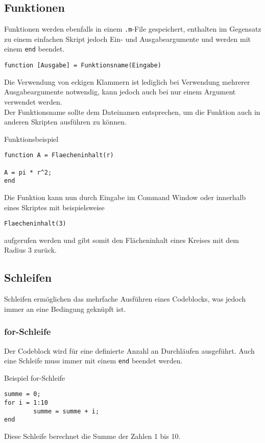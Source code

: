         \subsection{Funktionen}
        Funktionen werden ebenfalls in einem \texttt{.m}-File gespeichert, enthalten im Gegensatz zu einem einfachen Skript jedoch Ein- und Ausgabeargumente und werden mit einem \texttt{end} beendet.
        \begin{center}
                \texttt{function [Ausgabe] = Funktionsname(Eingabe)}     
        \end{center}
                Die Verwendung von eckigen Klammern ist lediglich bei Verwendung mehrerer Ausgabeargumente notwendig, kann jedoch auch bei nur einem Argument verwendet werden. \\
                Der Funktionsname sollte dem Dateinamen entsprechen, um die Funktion auch in anderen Skripten ausführen zu können.
                \begin{Codelösung}{Funktionsbeispiel}
                        \begin{lstlisting}
function A = Flaecheninhalt(r)

A = pi * r^2;
end       
                        \end{lstlisting}

                \end{Codelösung}
                \noindent
                Die Funktion kann nun durch Eingabe im Command Window oder innerhalb eines Skriptes mit beispielsweise
                \begin{center}
                        \texttt{Flaecheninhalt(3)}
                \end{center}
                aufgerufen werden und gibt somit den Flächeninhalt eines Kreises mit dem Radius 3 zurück.
        \subsection{Schleifen}
                Schleifen ermöglichen das mehrfache Ausführen eines Codeblocks, was jedoch immer an eine Bedingung geknüpft ist.
                \subsubsection*{for-Schleife}
                Der Codeblock wird für eine definierte Anzahl an Durchläufen ausgeführt. Auch eine Schleife muss immer mit einem \texttt{end} beendet werden.
                \begin{Codelösung}{Beispiel for-Schleife}
                        \begin{lstlisting}
summe = 0;
for i = 1:10
        summe = summe + i;
end
                        \end{lstlisting}
                \end{Codelösung}
        \noindent Diese Schleife berechnet die Summe der Zahlen 1 bis 10.
